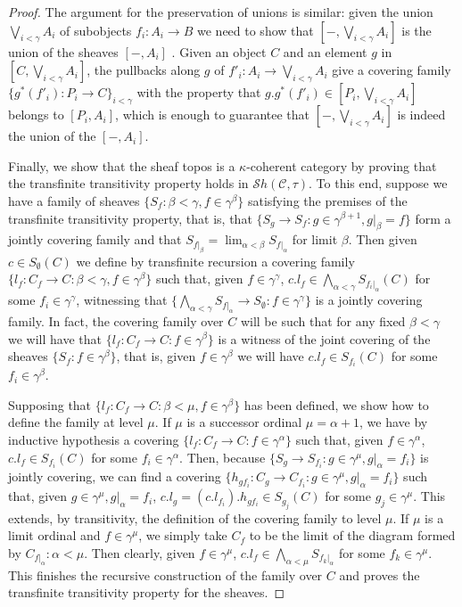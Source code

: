 \documentclass[a4paper,11pt]{article}
\theoremstyle{plain}
\theoremstyle{plain}
\theoremstyle{remark}
\begin{document}
\begin{proof}
 The argument for the preservation of unions is similar: given the union $\bigvee_{i<\gamma}A_i$ of subobjects $f_i: A_i \to B$ we need to show that $[-, \bigvee_{i<\gamma}A_i]$ is the union of the sheaves $[-, A_i]$ . Given an object $C$ and an element $g$ in $[C, \bigvee_{i<\gamma}A_i]$, the pullbacks along $g$ of $f'_i: A_i \to \bigvee_{i<\gamma}A_i$ give a covering family $\{g^*(f'_i): P_i \to C\}_{i<\gamma}$ with the property that $g.g^*(f'_i) \in [P_i, \bigvee_{i<\gamma}A_i]$ belongs to $[P_i, A_i]$, which is enough to guarantee that $[-, \bigvee_{i<\gamma}A_i]$ is indeed the union of the $[-, A_i]$.  
 
 Finally, we show that the sheaf topos is a $\kappa$-coherent category by proving that the transfinite transitivity property holds in $\mathcal{S}h(\mathcal{C}, \tau)$. To this end, suppose we have a family of sheaves $\{S_{f}: \beta<\gamma, f \in \gamma^{\beta}\}$ satisfying the premises of the transfinite transitivity property, that is, that $\{S_{g} \to S_f: g \in \gamma^{\beta+1}, g|_{\beta}=f\}$ form a jointly covering family and that $S_{f|_{\beta}}=\lim_{\alpha<\beta}S_{f|_{\alpha}}$ for limit $\beta$. Then given $c \in S_{\emptyset}(C)$ we define by transfinite recursion a covering family $\{l_f: C_{f} \to C: \beta<\gamma, f \in \gamma^{\beta}\}$ such that, given $f \in \gamma^{\gamma}$, $c.l_f \in \bigwedge_{\alpha<\gamma}S_{f_i|_{\alpha}}(C)$ for some $f_i \in \gamma^{\gamma}$, witnessing that $\{\bigwedge_{\alpha<\gamma}S_{f|_{\alpha}} \to S_{\emptyset}: f \in \gamma^{\gamma}\}$ is a jointly covering family. In fact, the covering family over $C$ will be such that for any fixed $\beta<\gamma$ we will have that $\{l_f: C_{f} \to C: f \in \gamma^{\beta}\}$ is a witness of the joint covering of the sheaves $\{S_{f}: f \in \gamma^{\beta}\}$, that is, given $f \in \gamma^{\beta}$ we will have $c.l_f \in S_{f_i}(C)$ for some $f_i \in \gamma^{\beta}$. 
 
 Supposing that $\{l_f: C_{f} \to C: \beta<\mu, f \in \gamma^{\beta}\}$ has been defined, we show how to define the family at level $\mu$. If $\mu$ is a successor ordinal $\mu=\alpha+1$, we have by inductive hypothesis a covering $\{l_f: C_{f} \to C: f \in \gamma^{\alpha}\}$ such that, given $f \in \gamma^{\alpha}$, $c.l_f \in S_{f_i}(C)$ for some $f_i \in \gamma^{\alpha}$. Then, because $\{S_{g} \to S_{f_i}: g \in \gamma^{\mu}, g|_{\alpha}=f_i\}$ is jointly covering, we can find a covering $\{h_{gf_i}: C_g \to C_{f_i} : g \in \gamma^{\mu}, g|_{\alpha}=f_i\}$ such that, given $g \in \gamma^{\mu}, g|_{\alpha}=f_i$, $c.l_g=(c.l_{f_i}).h_{gf_i} \in S_{g_j}(C)$ for some $g_j \in \gamma^{\mu}$. This extends, by transitivity, the definition of the covering family to level $\mu$. If $\mu$ is a limit ordinal and $f \in \gamma^\mu$, we simply take $C_f$ to be the limit of the diagram formed by $C_{f|_{\alpha}}: \alpha<\mu$. Then clearly, given $f \in \gamma^\mu$, $c.l_f \in \bigwedge_{\alpha<\mu}S_{f_k|_{\alpha}}$ for some $f_k \in \gamma^\mu$. This finishes the recursive construction of the family over $C$ and proves the transfinite transitivity property for the sheaves.
 
\end{proof}
\end{document}

